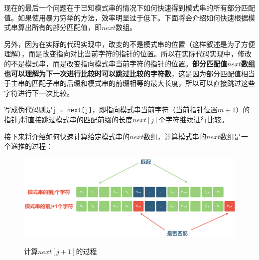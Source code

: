 现在的最后一个问题在于已知模式串的情况下如何快速得到模式串的所有部分匹配值。如果使用暴力穷举的方法，效率明显过于低下。下面将会介绍如何快速根据模式串算出所有的部分匹配值，即$next$数组。

另外，因为在实际的代码实现中，改变的不是模式串的位置（这样叙述是为了方便理解），而是改变指向对比当前字符的指针的位置。所以在实际代码实现中，修改的不是模式串，而是改变指向模式串当前字符的指针的位置。\textbf{部分匹配值$next$数组也可以理解为下一次进行比较时可以跳过比较的字符数}，这是因为部分匹配值相当于主串的匹配子串的后缀和模式串的前缀相等的最大长度，所以可以直接跳过这些字符进行下一次比较。

写成伪代码则是\texttt{j = next[j]}，即指向模式串当前字符（当前指针位置$m + 1$）的指针$j$将直接跳过模式串的匹配前缀的长度$next[j]$个字符继续进行比较。

接下来将介绍如何快速计算给定模式串的$next$数组，计算模式串的$next$数组是一个递推的过程：

\begin{figure}[!htb]
    \centering
    \includegraphics[width=0.8\linewidth]{images/KMP-3.pdf}\\
    \caption{计算$next[j + 1]$的过程}
    \label{fig:KMP-3}
\end{figure}

